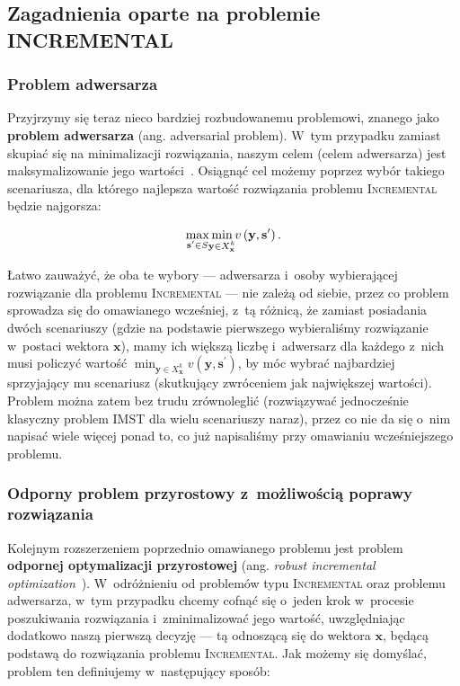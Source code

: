 \subsection{Zagadnienia oparte na problemie INCREMENTAL}



\subsubsection{Problem adwersarza}\label{sec:adv}


Przyjrzymy się teraz nieco bardziej rozbudowanemu problemowi, znanego jako \textbf{problem adwersarza} (ang. adversarial problem).
W~tym przypadku zamiast skupiać się na minimalizacji rozwiązania, naszym celem (celem adwersarza) jest maksymalizowanie jego wartości~\cite[$2$]{DBLP:journals/corr/NasrabadiO13}.
Osiągnąć cel możemy poprzez wybór takiego scenariusza, dla którego najlepsza wartość rozwiązania problemu \textsc{Incremental} będzie najgorsza:

\begin{equation}
	\max_{\mathclap{\textbf{s}^{\prime} \in S}} \min_{\mathclap{\textbf{y} \in X^{k}_{\textbf{x}}}} v \left( \textbf{y}, \textbf{s}^{\prime} \right)\text{.}
\end{equation}

Łatwo zauważyć, że oba te wybory --- adwersarza i~osoby wybierającej rozwiązanie dla problemu \textsc{Incremental} --- nie zależą od siebie, przez co problem sprowadza się do omawianego wcześniej, z~tą różnicą, że zamiast posiadania dwóch scenariuszy (gdzie na podstawie pierwszego wybieraliśmy rozwiązanie w~postaci wektora $\textbf{x}$), mamy ich większą liczbę i~adwersarz dla każdego z~nich musi policzyć wartość $\min_{\textbf{y} \in X^{k}_{\textbf{x}}} v \left( \textbf{y}, \textbf{s}^{\prime} \right)$, by móc wybrać najbardziej sprzyjający mu scenariusz (skutkujący zwróceniem jak największej wartości).
Problem można zatem bez trudu zrównoleglić (rozwiązywać jednocześnie klasyczny problem \textsc{IMST} dla wielu scenariuszy naraz), przez co nie da się o~nim napisać wiele więcej ponad to, co już napisaliśmy przy omawianiu wcześniejszego problemu.


\subsubsection{Odporny problem przyrostowy z~możliwością poprawy rozwiązania}


Kolejnym rozszerzeniem poprzednio omawianego problemu jest problem \textbf{odpornej optymalizacji przyrostowej} (ang. \textit{robust incremental optimization}~\cite[$2$]{DBLP:journals/corr/NasrabadiO13}).
W~odróżnieniu od problemów typu \textsc{Incremental} oraz problemu adwersarza, w~tym przypadku chcemy cofnąć się o~jeden krok w~procesie poszukiwania rozwiązania i~zminimalizować jego wartość, uwzględniając dodatkowo naszą pierwszą decyzję --- tą odnoszącą się do wektora $\textbf{x}$, będącą podstawą do rozwiązania problemu \textsc{Incremental}.
Jak możemy się domyślać, problem ten definiujemy w~następujący sposób:

